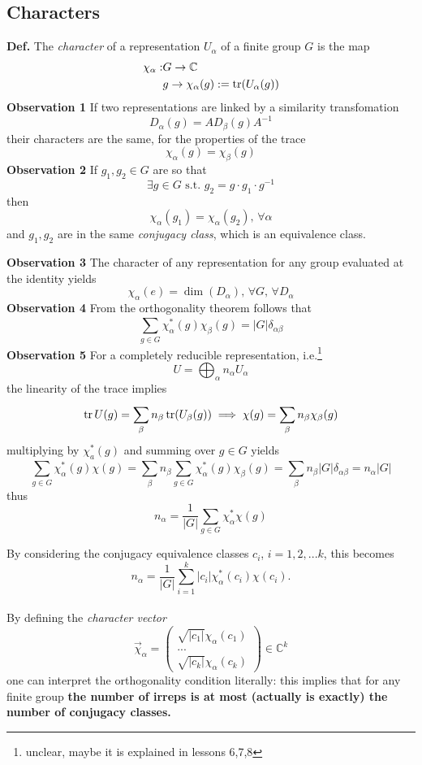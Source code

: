 
\subsection{Characters}
\textbf{Def.} The \textit{character} of a representation $U_\alpha$ of a finite
group $G$ is the map
\begin{align*}
    \chi_\alpha:&G\to\mathbb{C}\\
                &g\to\chi_\alpha(g):=\tr(U_\alpha(g))
\end{align*}
\textbf{Observation 1} If two representations are linked by a similarity
transfomation
$$D_\alpha(g)=AD_\beta(g)A^{-1}$$
their characters are the same, for the properties of the trace
$$\chi_\alpha(g)=\chi_\beta(g)$$
\textbf{Observation 2} If $g_1,g_2\in G$ are so that
$$\exists g\in G\text{ s.t. }g_2=g\cdot g_1\cdot g^{-1}$$
then
$$\chi_\alpha(g_1)=\chi_\alpha(g_2),\,\forall \alpha$$
and $g_1,g_2$ are in the same \textit{conjugacy class}, which is an equivalence
class.

\textbf{Observation 3} The character of any representation for any group
evaluated at the identity yields
$$\chi_\alpha(e)=\dim(D_\alpha),\,\forall G,\,\forall D_\alpha$$
\textbf{Observation 4} From the orthogonality theorem follows that
$$\sum_{g\in G}^{} \chi_\alpha^*(g)\chi_\beta(g) = |G|\delta_{\alpha\beta}$$
\textbf{Observation 5} For a completely reducible representation, i.e.\footnote{
unclear, maybe it is explained in lessons 6,7,8}
$$U=\bigoplus_\alpha n_\alpha U_\alpha$$
the linearity of the trace implies
$$\tr U(g)=\sum_{\beta}^{}n_\beta\tr(U_\beta(g))\implies\chi(g)=
\sum_{\beta}^{}n_\beta\chi_\beta(g)$$
multiplying by $\chi^*_a(g)$ and summing over $g\in G$ yields
$$\sum_{g\in G}^{}\chi_\alpha^*(g)\chi(g) = \sum_{\beta}^{}n_\beta\sum_{g\in G}
\chi_\alpha^*(g)\chi_\beta(g)=\sum_{\beta}^{}n_\beta|G|\delta_{\alpha\beta}=
n_\alpha|G|$$
thus
$$n_\alpha = \frac{1}{|G|}\sum_{g\in G}^{}\chi_\alpha^*\chi(g)$$

By considering the conjugacy equivalence classes $c_i$, $i=1,2,...k$,
this becomes
$$n_\alpha= \frac{1}{|G|}\sum_{i=1}^{k}|c_i|\chi_\alpha^*(c_i)\chi(c_i).$$\\

By defining the \textit{character vector}
$$\vec{\chi}_\alpha = \begin{pmatrix}
\sqrt{|c_1|}\chi_\alpha(c_1)\\...\\\sqrt{|c_k|}\chi_\alpha(c_k)
\end{pmatrix}\in\mathbb{C}^k
$$
one can interpret the orthogonality condition literally: this implies that
for any finite group \textbf{the number of irreps is at most (actually is exactly)
the number of conjugacy classes.}

